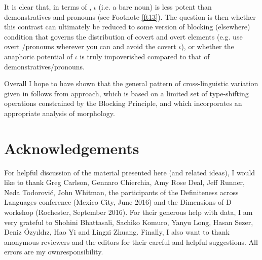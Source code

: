 \documentclass[output=paper,
modfonts
]{langscibook}
\begin{document}
	It is clear that, in terms of , $\iota$ (i.e. a bare noun) is less potent than demonstratives and pronouns (see Footnote \ref{ft13}). The question is then whether this contrast can ultimately be reduced to some version of blocking (elsewhere) condition that governs the distribution of covert and overt elements (e.g. use overt /pronouns wherever you can and avoid the covert $\iota$), or whether the anaphoric potential of $\iota$ is truly impoverished compared to that of demonstratives/pronouns. 
	
	Overall I hope to have shown that the general pattern of cross-linguistic variation given in  follows from  approach, which is based on a limited set of type-shifting operations constrained by the Blocking Principle, and which incorporates an appropriate analysis of  morphology.
	
		\section*{Acknowledgements}
	For helpful discussion of the material presented here (and related ideas), I would like to thank Greg Carlson, Gennaro Chierchia, Amy Rose Deal, Jeff Runner, Neda Todorovi\'c, John Whitman, the participants of the Definiteness across Languages conference (Mexico City, June 2016) and the Dimensions of D workshop (Rochester, September 2016). For their generous help with data, I am very grateful to Shohini Bhattasali, Sachiko Komuro, Yanyu Long, Hasan Sezer, Deniz \"Ozy\i ld\i z, Hao Yi and Lingzi Zhuang. Finally, I also want to thank anonymous reviewers and the editors for their careful and helpful suggestions. All errors are my own\largerpage responsibility.	
	
\end{document}
